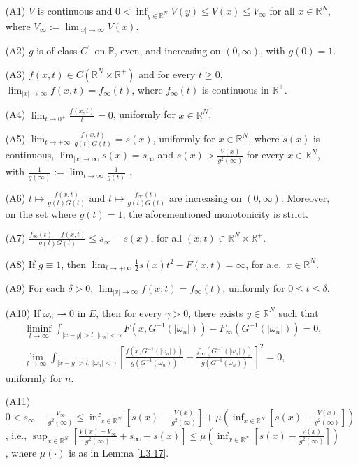 \documentclass[reqno]{amsart}
\begin{document}
\begin{itemize}
\item[(A1)] $V$ is continuous and $0<\inf_{y\in{\mathbb{R}^N}} V(y)\leq V(x)\leq V_\infty$ for all
 $x\in {\mathbb{R}^N}$, where $V_{\infty}:=\lim_{|x| \to \infty} V(x)$.

\item[(A2)]  \(g\) is of class \(C^1\) on \(\mathbb{R}\), even, and  increasing on $ (0,\infty)$, with $g(0)=1$.

\item[(A3)] $f(x,t)\in C({\mathbb{R}^N}\times\mathbb{R}^+)$ and for every $t\geq 0$, 
$\lim_{|x|\to\infty}f(x,t)=f_{\infty}(t)$, where $f_{\infty}(t)$ is continuous in $\mathbb{R}^+$.

\item[(A4)] $\lim_{t\to0^+}\frac{f(x,t)}{t}=0$, uniformly for $x\in{\mathbb{R}^N}$.

\item[(A5)] $\lim_{t\to+\infty}\frac{f(x,t)}{g(t)G(t)}=s(x)$, uniformly for $x\in{\mathbb{R}^N}$, where $s(x)$ 
is continuous, $\lim_{|x| \to \infty} s(x) = s_{\infty}$ and $s(x)>\frac{V(x)}{g^2(\infty)}$ for every 
$x\in{\mathbb{R}^N}$, with $\frac{1}{g(\infty)}:=\lim_{t\to\infty}\frac{1}{g(t)}$ .

\item[(A6)] $t\mapsto \frac{f(x,t)}{g(t)G(t)}$ and $t\mapsto \frac{f_\infty(t)}{g(t)G(t)}$ are increasing 
on $(0,\infty)$. Moreover, on the set where $g(t)=1$, the aforementioned monotonicity is strict.

\item[(A7)] $\frac{f_{\infty}(t)-f(x,t)}{g(t)G(t)}\leq s_{\infty}-s(x)$, for all $(x,t)\in{\mathbb{R}^N}\times\mathbb{R}^+$.

\item[(A8)] If $g\equiv 1$, then $\lim_{t\to+\infty}\frac{1}{2}s(x)t^2-F(x,t)=\infty$, for a.e.\
 $x\in {\mathbb{R}^N}$.

\item[(A9)] For each $\delta>0$, $\lim_{|x|\to\infty}f(x,t)=f_{\infty}(t)$, uniformly for 
$0\leq t\leq\delta$.

\item[(A10)]   If $\omega_n \rightharpoonup 0$ in $E$, then for every $\gamma>0$, 
there exists $y\in{\mathbb{R}^N}$ such that 
\begin{gather*}
\liminf_{l\to \infty}\int_{|x-y|>l,\,|\omega_n|<\gamma}F(x,G^{-1}(|\omega_n|))-F_{\infty}(G^{-1}(|\omega_n|))=0, \\
\lim_{l\to \infty}\int_{|x-y|>l,\,|\omega_n|<\gamma}[\frac{f(x,G^{-1}(|\omega_n|))}{g(G^{-1}
(\omega_n))}-\frac{f_{\infty}(G^{-1}(|\omega_n|))}{g(G^{-1}(\omega_n))}]^2=0,
\end{gather*}
uniformly for $n$.

\item[(A11)] $0<s_{\infty}-\frac{V_{\infty}}{g^2(\infty)}\leq\inf _{x\in{\mathbb{R}^N}}[s(x)-\frac{V(x)}{g^2(\infty)}]
+\mu(\inf _{x\in{\mathbb{R}^N}}[s(x)-\frac{V(x)}{g^2(\infty)}])$, i.e., 
$\sup _{x\in{\mathbb{R}^N}}[\frac{V(x)-V_{\infty}}{g^2(\infty)} +s_{\infty}-s(x)]\leq\mu(\inf _{x\in{\mathbb{R}^N}}[s(x)-\frac{V(x)}{g^2(\infty)}])$, 
where $\mu(\cdot)$ is as in Lemma \ref{L3.17}.
\end{itemize}
\end{document}
